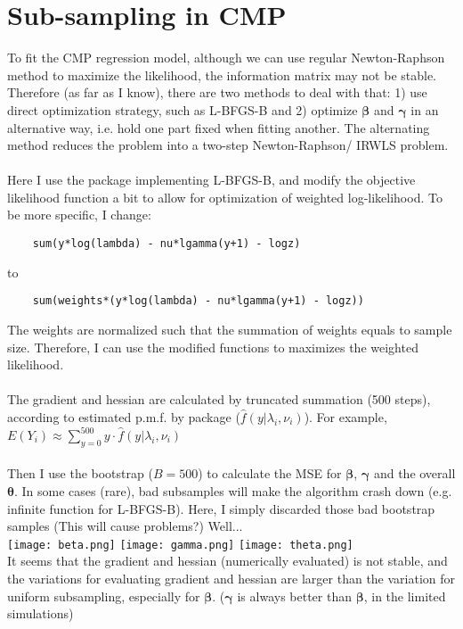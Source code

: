 \documentclass[]{article}
\begin{document}
\section{Sub-sampling in CMP}
To fit the CMP regression model, although we can use regular Newton-Raphson method to maximize the likelihood, the information matrix may not be stable. Therefore (as far as I know), there are two methods to deal with that: 1) use direct optimization strategy, such as L-BFGS-B and 2) optimize $\boldsymbol{\beta}$ and $\boldsymbol{\gamma}$ in an alternative way, i.e. hold one part fixed when fitting another. The alternating method reduces the problem into a two-step Newton-Raphson/ IRWLS problem.\\
\\
Here I use the package implementing L-BFGS-B, and modify the objective likelihood function a bit to allow for optimization of weighted log-likelihood. To be more specific, I change:
\begin{lstlisting}
	sum(y*log(lambda) - nu*lgamma(y+1) - logz)
\end{lstlisting} 
to
\begin{lstlisting}
	sum(weights*(y*log(lambda) - nu*lgamma(y+1) - logz))
\end{lstlisting} 
The weights are normalized such that the summation of weights equals to sample size. Therefore, I can use the modified functions to maximizes the weighted likelihood.\\
\\
The gradient and hessian are calculated by truncated summation (500 steps), according to estimated p.m.f. by package ($\hat{f}(y|\lambda_i, \nu_i)$). For example, $E(Y_i) \approx \sum_{y=0}^{500}y\cdot \hat{f}(y|\lambda_i, \nu_i)$\\
\\
Then I use the bootstrap ($B = 500$) to calculate the MSE for $\boldsymbol{\beta}$, $\boldsymbol{\gamma}$ and the overall $\boldsymbol{\theta}$. In some cases (rare), bad subsamples will make the algorithm crash down (e.g. infinite function for L-BFGS-B). Here, I simply discarded those bad bootstrap samples (This will cause problems?) Well...\\
\texttt{[image: beta.png]}
\texttt{[image: gamma.png]}
\texttt{[image: theta.png]}
\\
It seems that the gradient and hessian (numerically evaluated) is not stable, and the variations for evaluating gradient and hessian are larger than the variation for uniform subsampling, especially for $\boldsymbol{\beta}$. ($\boldsymbol{\gamma}$ is always better than $\boldsymbol{\beta}$, in the limited simulations) 
















 












	
	
	
	
	
	
\end{document}
